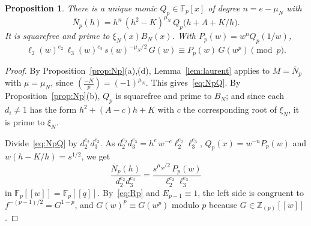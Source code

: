 \documentclass[11pt,a4paper]{article}
\newtheorem{proposition}[theorem]{Proposition}
\theoremstyle{definition}
\theoremstyle{remark}
\newcommand{\F}{\mathbb{F}}
\newcommand{\Z}{\mathbb{Z}}
\newcommand{\leg}[2]{\left(\frac{#1}{#2}\right)}
\newcommand{\Zp}{\Z_{(p)}}
\numberwithin{equation}{section}
\begin{document}
\begin{proposition}\label{prop:frob}
There is a unique monic $Q_p\in\F_p[x]$ of degree $n=e-\mu_N$ with
\begin{equation}\label{eq:NpQ}
\overline N_p(h)=h^{n}\,(h^2-K)^{\mu_N}\,Q_p\bigl(h+A+K/h\bigr).
\end{equation}
It is squarefree and prime to $\xi_N(x)B_N(x)$. With $P_p(w)=w^nQ_p(1/w)$,
\begin{equation}\label{eq:frob}
\ell_2(w)^{e_2}\,\ell_3(w)^{e_3}\,s(w)^{-\mu_N/2}\,G(w)\equiv P_p(w)\,G(w^p)
\pmod p .
\end{equation}
\end{proposition}
\begin{proof}
By Proposition~\ref{prop:Np}(a),(d), Lemma~\ref{lem:laurent} applies to
$M=\overline N_p$ with $\mu=\mu_N$, since $\leg{-N}{p}=(-1)^{\mu_N}$. This
gives~\eqref{eq:NpQ}. By Proposition~\ref{prop:Np}(b), $Q_p$ is squarefree and
prime to $B_N$; and since each $d_i\ne1$ has the form $h^2+(A-c)h+K$ with $c$
the corresponding root of $\xi_N$, it is prime to $\xi_N$.

Divide~\eqref{eq:NpQ} by $d_2^{e_2}d_3^{e_3}$. As
$d_2^{e_2}d_3^{e_3}=h^e\,w^{-e}\ell_2^{e_2}\ell_3^{e_3}$,
$Q_p(x)=w^{-n}P_p(w)$ and $w(h-K/h)=s^{1/2}$, we get
\[
\frac{\overline N_p(h)}{d_2^{e_2}d_3^{e_3}}
=\frac{s^{\mu_N/2}\,P_p(w)}{\ell_2^{e_2}\ell_3^{e_3}}
\]
in $\F_p[[w]]=\F_p[[q]]$. By~\eqref{eq:Rp} and $E_{p-1}\equiv1$, the left
side is congruent to $f^{-(p-1)/2}=G^{1-p}$, and $G(w)^p\equiv G(w^p)$ modulo
$p$ because $G\in\Zp[[w]]$.
\end{proof}
\end{document}
